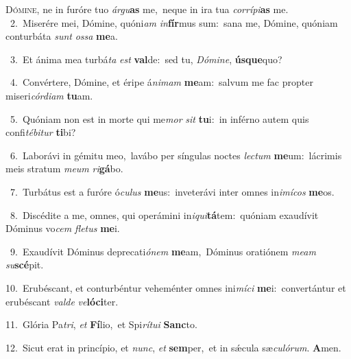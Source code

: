 \lettrine{\initial\textcolor{\initialcolor}{D}}{ómine,} ne in furóre tuo \textit{ár}\-\textit{gu}\textbf{as} me,~\star neque in ira tua \textit{cor}\-\textit{rí}\textit{pi}\textbf{as} me.\\
{\numbfont\textcolor{\numbcolor}{~2.}}~Miserére mei, Dómine, quóni\textit{am} \textit{in}\-\textbf{fír}mus sum:~\star sana me, Dómine, quóniam conturbáta \textit{sunt} \textit{os}\-\textit{sa} \textbf{me}\-a.\par
{\numbfont\textcolor{\numbcolor}{~3.}}~Et ánima mea turbá\textit{ta} \textit{est} \textbf{val}\-de:~\star sed tu, \textit{Dó}\-\textit{mi}\textit{ne}, \textbf{ús}\-\textbf{que}quo?\par
{\numbfont\textcolor{\numbcolor}{~4.}}~Convértere, Dómine, et éripe á\-\textit{ni}\-\textit{mam} \textbf{me}\-am:~\star salvum me fac propter miseri\-\textit{cór}\-\textit{di}\textit{am} \textbf{tu}\-am.\par
{\numbfont\textcolor{\numbcolor}{~5.}}~Quóniam non est in morte qui me\textit{mor} \textit{sit} \textbf{tu}\-i:~\star in inférno autem quis confi\-\textit{té}\-\textit{bi}\textit{tur} \textbf{ti}\-bi?\par
{\numbfont\textcolor{\numbcolor}{~6.}}~Laborávi in gémitu meo,~\dagger lavábo per síngulas noctes \textit{lec}\-\textit{tum} \textbf{me}\-um:~\star lácrimis meis stratum \textit{me}\-\textit{um} \textit{ri}\-\textbf{gá}bo.\par
{\numbfont\textcolor{\numbcolor}{~7.}}~Turbátus est a furóre ó\-\textit{cu}\-\textit{lus} \textbf{me}\-us:~\star inveterávi inter omnes in\-\textit{i}\-\textit{mí}\textit{cos} \textbf{me}\-os.\par
{\numbfont\textcolor{\numbcolor}{~8.}}~Discédite a me, omnes, qui operámini in\-\textit{i}\-\textit{qui}\textbf{tá}tem:~\star quóniam exaudívit Dóminus vo\textit{cem} \textit{fle}\-\textit{tus} \textbf{me}\-i.\par
{\numbfont\textcolor{\numbcolor}{~9.}}~Exaudívit Dóminus deprecati\-\textit{ó}\-\textit{nem} \textbf{me}\-am,~\star Dóminus oratiónem \textit{me}\-\textit{am} \textit{su}\-\textbf{scé}pit.\par
{\numbfont\textcolor{\numbcolor}{10.}}~Erubéscant, et conturbéntur veheménter omnes ini\-\textit{mí}\-\textit{ci} \textbf{me}\-i:~\star convertántur et erubéscant \textit{val}\-\textit{de} \textit{ve}\-\textbf{ló}\textbf{ci}ter.\par
{\numbfont\textcolor{\numbcolor}{11.}}~Glória Pa\-\textit{tri}\-, \textit{et} \textbf{Fí}\-lio,~\star et Spi\-\textit{rí}\-\textit{tu}\textit{i} \textbf{Sanc}\-to.\par
{\numbfont\textcolor{\numbcolor}{12.}}~Sicut erat in princípio, et \textit{nunc}\-, \textit{et} \textbf{sem}\-per,~\star et in sǽcula sæ\-\textit{cu}\-\textit{ló}\textit{rum}. \textbf{A}\-men.\par
